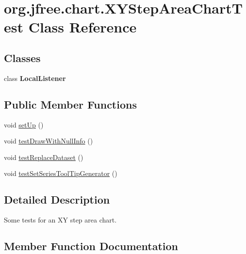 \hypertarget{classorg_1_1jfree_1_1chart_1_1_x_y_step_area_chart_test}{}\section{org.\+jfree.\+chart.\+X\+Y\+Step\+Area\+Chart\+Test Class Reference}
\label{classorg_1_1jfree_1_1chart_1_1_x_y_step_area_chart_test}
\subsection*{Classes}
\begin{DoxyCompactItemize}
\item 
class {\bfseries Local\+Listener}
\end{DoxyCompactItemize}
\subsection*{Public Member Functions}
\begin{DoxyCompactItemize}
\item 
void \mbox{\hyperlink{classorg_1_1jfree_1_1chart_1_1_x_y_step_area_chart_test_af7cf283111a24f9a0d8b8cfc86de643f}{set\+Up}} ()
\item 
void \mbox{\hyperlink{classorg_1_1jfree_1_1chart_1_1_x_y_step_area_chart_test_a86bf62e61e4546ada6f84723ce4c7ea4}{test\+Draw\+With\+Null\+Info}} ()
\item 
void \mbox{\hyperlink{classorg_1_1jfree_1_1chart_1_1_x_y_step_area_chart_test_a5322c762d4b91ead04c3721cc7b38c33}{test\+Replace\+Dataset}} ()
\item 
void \mbox{\hyperlink{classorg_1_1jfree_1_1chart_1_1_x_y_step_area_chart_test_a90d028a10a8fc3a3d507cdf1132d7332}{test\+Set\+Series\+Tool\+Tip\+Generator}} ()
\end{DoxyCompactItemize}


\subsection{Detailed Description}
Some tests for an XY step area chart. 

\subsection{Member Function Documentation}
\mbox{\label{classorg_1_1jfree_1_1chart_1_1_x_y_step_area_chart_test_af7cf283111a24f9a0d8b8cfc86de643f}} 
